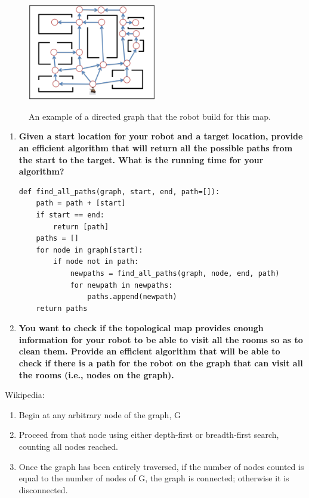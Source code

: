 \documentclass[11pt]{article}
\begin{document}
\begin{figure}[h]
  \centering
  \caption{An example of a directed graph that the robot build for this map.}
    \includegraphics[width=0.5\textwidth]{paths}
    \label{fig:problem3}
\end{figure}

\begin{enumerate}[label=\Alph*.]

\item \textbf{Given a start location for your robot and a target
location, provide an efficient algorithm that will return all the
possible paths from the start to the target.  What is the running time
for your algorithm?}

\begin{verbatim}
def find_all_paths(graph, start, end, path=[]):
    path = path + [start]
    if start == end:
        return [path]
    paths = []
    for node in graph[start]:
        if node not in path:
            newpaths = find_all_paths(graph, node, end, path)
            for newpath in newpaths:
                paths.append(newpath)
    return paths 
\end{verbatim}

\item \textbf{You want to check if the topological map provides
enough information for your robot to be able to visit all the rooms so
as to clean them. Provide an efficient algorithm that will be able to
check if there is a path for the robot on the graph that can visit all
the rooms (i.e., nodes on the graph).}
\end{enumerate}

Wikipedia:
\begin{enumerate}
\item Begin at any arbitrary node of the graph, G
\item Proceed from that node using either depth-first or breadth-first search, counting all nodes reached.
\item Once the graph has been entirely traversed, if the number of nodes counted is equal to the number of nodes of G, the graph is connected; otherwise it is disconnected.
\end{enumerate}
\end{document}
